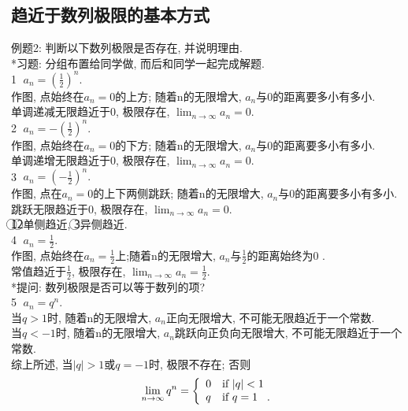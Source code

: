 \documentclass{article}
\begin{document}
\begin{CJK}{UTF8}{gkai}
\subsection{趋近于数列极限的基本方式}
例题2: 判断以下数列极限是否存在, 并说明理由.\\
*习题: 分组布置给同学做, 而后和同学一起完成解题.\\
\newline
\textcircled{1} $a_n = (\frac{1}{2})^n.$\\
作图, 点始终在$a_n = 0$的上方; 随着n的无限增大, $a_n$与0的距离要多小有多小.\\
单调递减无限趋近于0, 极限存在, $\lim_{n \to \infty}{a_n} = 0.$\\
\newline
\textcircled{2} $a_n = -(\frac{1}{2})^n.$\\
作图, 点始终在$a_n = 0$的下方; 随着n的无限增大, $a_n$与0的距离要多小有多小.\\
单调递增无限趋近于0, 极限存在, $\lim_{n \to \infty}{a_n} = 0.$\\
\newline
\textcircled{3} $a_n = (-\frac{1}{2})^n.$\\
作图, 点在$a_n = 0$的上下两侧跳跃; 随着n的无限增大, $a_n$与0的距离要多小有多小.\\
跳跃无限趋近于0, 极限存在, $\lim_{n \to \infty}{a_n} = 0.$\\
\newline
\textcircled{1}\textcircled{2}单侧趋近, \textcircled{3}异侧趋近.\\
\newline
\textcircled{4} $a_n = \frac{1}{2}.$\\
作图, 点始终在$a_n =  \frac{1}{2}$上;随着n的无限增大, $a_n$与$\frac{1}{2}$的距离始终为0 .\\
常值趋近于$\frac{1}{2}$, 极限存在, $\lim_{n \to \infty}{a_n} = \frac{1}{2}.$\\
\newline
*提问: 数列极限是否可以等于数列的项?\\
\newpage
\textcircled{5} $a_n = q^n.$\\
当$q > 1$时, 随着n的无限增大, $a_n$正向无限增大, 不可能无限趋近于一个常数.\\
当$q < -1$时, 随着n的无限增大, $a_n$跳跃向正负向无限增大, 不可能无限趋近于一个常数.\\
\newline
综上所述, 当$|q| > 1$或$q = -1$时, 极限不存在; 否则 \\
\begin{displaymath}
\lim_{n \to \infty}{q^n} = \left\{ \begin{array}{ll}
 0 & \textrm{if $|q| < 1$}\\
 q & \textrm{if $q = 1$}\hspace{3mm}.\\
  \end{array} \right.
\end{displaymath}


\end{CJK}
\end{document}
